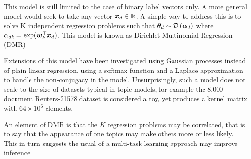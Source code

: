 This model is still limited to the case of binary label vectors only. A more general model would seek to take any vector ${ \bm x_d } \in \mathbb{R}$. A simple way to address this is to solve K independent regression problems such that ${ \bm \theta_d } \sim \mathcal{D} \left( {\bm \alpha_{d}} \right)$ where $\alpha_{dk} = \exp(\bm w_k^\top\bm x_d)$\cite{Mimno2008}. This model is known as Dirichlet Multinomial Regression (DMR)

Extensions of this model have been investigated using Gaussian processes instead of plain linear regression, using a softmax function\cite{Hennig2012} and a Laplace approximation\cite{WilliamsBarber1998} to handle the non-conjugacy in the model. Unsurprisingly, such a model does not scale to the size of datasets typical in topic models, for example the 8,000 document Reuters-21578 dataset is considered a toy, yet produces a kernel matrix with $64 \times 10^6$ elements.

An element of DMR is that the $K$ regression problems may be correlated, that is to say that the appearance of one topics may make others more or less likely. This in turn suggests the usual of a multi-task learning approach may improve inference.


